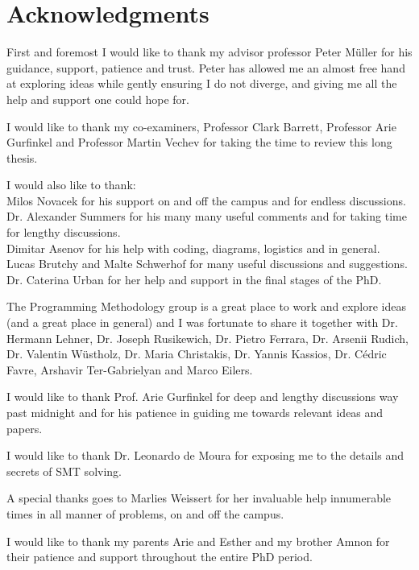 \chapter*{Acknowledgments}

First and foremost I would like to thank my advisor professor Peter M{\"u}ller for his guidance, support, patience and trust. Peter has allowed me an almost free hand at exploring ideas while gently ensuring I do not diverge, and giving me all the help and support one could hope for.

I would like to thank my co-examiners, Professor Clark Barrett, Professor Arie Gurfinkel and Professor Martin Vechev for taking the time to review this long thesis.

I would also like to thank:\\
Milos Novacek for his support on and off the campus and for endless discussions.\\
Dr. Alexander Summers for his many many useful comments and for taking time for lengthy discussions.\\
Dimitar Asenov for his help with coding, diagrams, logistics and in general.\\
Lucas Brutchy and Malte Schwerhof for many useful discussions and suggestions.\\
Dr. Caterina Urban for her help and support in the final stages of the PhD.

The Programming Methodology group is a great place to work and explore ideas (and a great place in general) and I was fortunate to share it together with Dr. Hermann Lehner, Dr. Joseph Rusikewich, Dr. Pietro Ferrara, Dr. Arsenii Rudich, Dr. Valentin Wüstholz, Dr. Maria Christakis, Dr. Yannis Kassios, Dr. Cédric Favre, Arshavir Ter-Gabrielyan and Marco Eilers.

I would like to thank Prof. Arie Gurfinkel for deep and lengthy discussions way past midnight and for his patience in guiding me towards relevant ideas and papers.

I would like to thank Dr. Leonardo de Moura for exposing me to the details and secrets of SMT solving.

A special thanks goes to Marlies Weissert for her invaluable help innumerable times in all manner of problems, on and off the campus.

I would like to thank my parents Arie and Esther and my brother Amnon for their patience and support throughout the entire PhD period.



